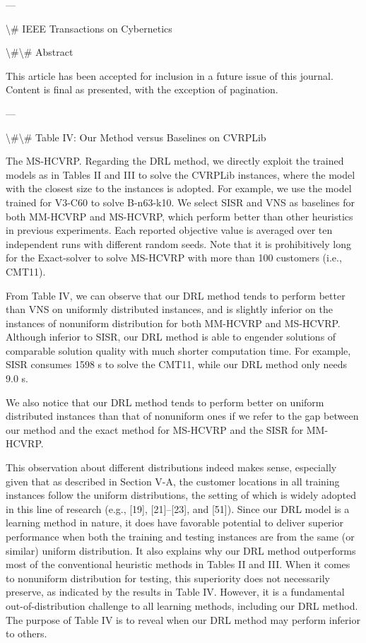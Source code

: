 \documentclass{article}
\begin{document}
	---
	
	\textbackslash{}# IEEE Transactions on Cybernetics
	
	\textbackslash{}#\textbackslash{}# Abstract
	
	This article has been accepted for inclusion in a future issue of this journal. Content is final as presented, with the exception of pagination.
	
	---
	
	\textbackslash{}#\textbackslash{}# Table IV: Our Method versus Baselines on CVRPLib
	
	The MS-HCVRP. Regarding the DRL method, we directly exploit the trained models as in Tables II and III to solve the CVRPLib instances, where the model with the closest size to the instances is adopted. For example, we use the model trained for V3-C60 to solve B-n63-k10. We select SISR and VNS as baselines for both MM-HCVRP and MS-HCVRP, which perform better than other heuristics in previous experiments. Each reported objective value is averaged over ten independent runs with different random seeds. Note that it is prohibitively long for the Exact-solver to solve MS-HCVRP with more than 100 customers (i.e., CMT11).
	
	From Table IV, we can observe that our DRL method tends to perform better than VNS on uniformly distributed instances, and is slightly inferior on the instances of nonuniform distribution for both MM-HCVRP and MS-HCVRP. Although inferior to SISR, our DRL method is able to engender solutions of comparable solution quality with much shorter computation time. For example, SISR consumes 1598 s to solve the CMT11, while our DRL method only needs 9.0 s.
	
	We also notice that our DRL method tends to perform better on uniform distributed instances than that of nonuniform ones if we refer to the gap between our method and the exact method for MS-HCVRP and the SISR for MM-HCVRP.
	
	This observation about different distributions indeed makes sense, especially given that as described in Section V-A, the customer locations in all training instances follow the uniform distributions, the setting of which is widely adopted in this line of research (e.g., [19], [21]–[23], and [51]). Since our DRL model is a learning method in nature, it does have favorable potential to deliver superior performance when both the training and testing instances are from the same (or similar) uniform distribution. It also explains why our DRL method outperforms most of the conventional heuristic methods in Tables II and III. When it comes to nonuniform distribution for testing, this superiority does not necessarily preserve, as indicated by the results in Table IV. However, it is a fundamental out-of-distribution challenge to all learning methods, including our DRL method. The purpose of Table IV is to reveal when our DRL method may perform inferior to others.
	
\end{document}
